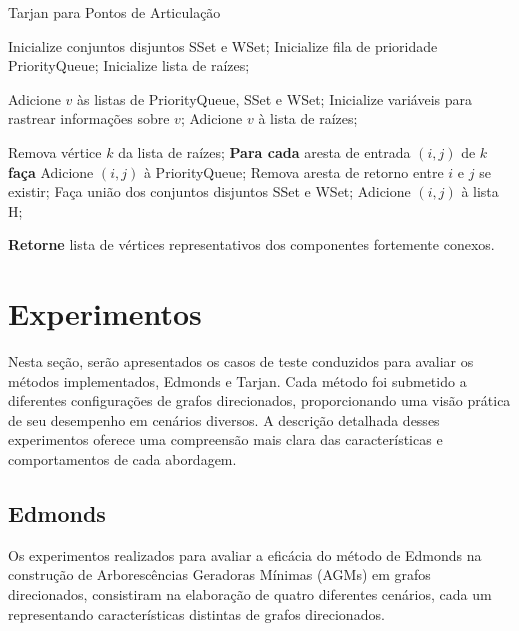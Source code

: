 \documentclass[12pt]{article}
\begin{document}
\begin{algorithm}
\caption{Tarjan para Pontos de Articulação}
\begin{algorithmic}[1]
    \State Inicialize conjuntos disjuntos SSet e WSet;
    \State Inicialize fila de prioridade PriorityQueue;
    \State Inicialize lista de raízes;
    
        \State Adicione $v$ às listas de PriorityQueue, SSet e WSet;
        \State Inicialize variáveis para rastrear informações sobre $v$;
        \State Adicione $v$ à lista de raízes;
    \EndFor
    
        \State Remova vértice $k$ da lista de raízes;
            \State \textbf{Para cada} aresta de entrada $(i, j)$ de $k$ \textbf{faça}
                    \State Adicione $(i, j)$ à PriorityQueue;
                    \State Remova aresta de retorno entre $i$ e $j$ se existir;
                    \State Faça união dos conjuntos disjuntos SSet e WSet;
                \Else
                    \State Adicione $(i, j)$ à lista H;
                \EndIf
            \EndFor
        \EndIf
    \EndWhile
    
    \State \textbf{Retorne} lista de vértices representativos dos componentes fortemente conexos.
\EndFunction
\end{algorithmic}
\end{algorithm}

\section{Experimentos}

Nesta seção, serão apresentados os casos de teste conduzidos para avaliar os métodos implementados, Edmonds e Tarjan. Cada método foi submetido a diferentes configurações de grafos direcionados, proporcionando uma visão prática de seu desempenho em cenários diversos. A descrição detalhada desses experimentos oferece uma compreensão mais clara das características e comportamentos de cada abordagem.

\subsection{Edmonds}

Os experimentos realizados para avaliar a eficácia do método de Edmonds na construção de Arborescências Geradoras Mínimas (AGMs) em grafos direcionados, consistiram na elaboração de quatro diferentes cenários, cada um representando características distintas de grafos direcionados.
\end{document}
